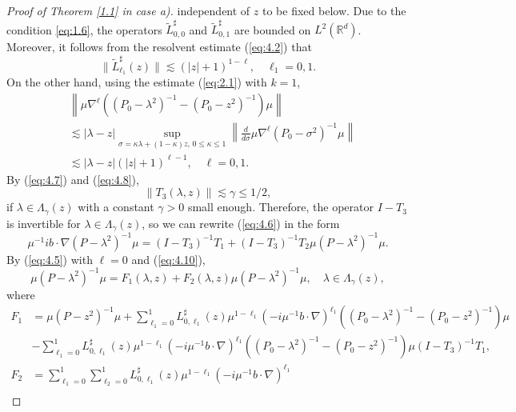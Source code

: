 \documentclass[11pt]{amsart}
\numberwithin{equation}{section}
\def\R{{\mathbb R}}
\begin{document}
\begin{proof}[Proof of Theorem \ref{1.1} in case a)]
independent of $z$ to be fixed below. Due to the condition \eqref{eq:1.6}, the operators 
$\widetilde L_{0,0}^\sharp$ and $\widetilde L_{0,1}^\sharp$ are bounded on $L^2(\R^d)$. Moreover, it follows from the resolvent estimate (\ref{eq:4.2}) that
\begin{equation}\label{eq:4.7}
\|\widetilde L_{\ell_1}^\sharp(z)\|\lesssim (|z|+1)^{1-\ell},\quad \ell_1=0,1.
\end{equation}
On the other hand, using the estimate (\ref{eq:2.1}) with $k=1$,
\begin{equation}\label{eq:4.8}
\begin{split}
&\left\|\mu \nabla^{\ell}((P_0-\lambda^2)^{-1}-(P_0-z^2)^{-1})\mu\right\|\\
&\lesssim|\lambda-z|\sup_{\sigma=\kappa\lambda+(1-\kappa)z,\,0\le\kappa\le 1}\left\|\frac{d}{d\sigma} \mu \nabla^{\ell}(P_0-\sigma^2)^{-1}\mu\right\|\\
&\lesssim |\lambda-z|(|z|+1)^{\ell-1},\quad \ell=0,1.
\end{split}
\end{equation}
By (\ref{eq:4.7}) and (\ref{eq:4.8}),
\begin{equation}\label{eq:4.9}
\|T_3(\lambda,z)\|\lesssim \gamma\le 1/2,
\end{equation}
if $\lambda\in\Lambda_\gamma(z)$ with a constant $\gamma>0$ small enough. Therefore, the operator $I-T_3$
is invertible for $\lambda\in\Lambda_\gamma(z)$, so we can rewrite (\ref{eq:4.6}) in the form
\begin{equation}\label{eq:4.10}
\mu^{-1}ib\cdot\nabla(P-\lambda^2)^{-1}\mu=(I-T_3)^{-1}T_1+(I-T_3)^{-1}T_2\mu(P-\lambda^2)^{-1}\mu.
\end{equation}
By (\ref{eq:4.5}) with $\ell = 0$ and (\ref{eq:4.10}),
\begin{equation}\label{eq:4.11}
\mu(P-\lambda^2)^{-1}\mu=F_1(\lambda,z)+F_2(\lambda,z)\mu(P-\lambda^2)^{-1}\mu,\quad \lambda\in\Lambda_\gamma(z),
\end{equation}
where
\begin{align*}
 F_1&=\mu(P-z^2)^{-1}\mu + \sum_{\ell_1 = 0}^1 L^\sharp_{0, \ell_1}(z)\mu^{1-\ell_1}(-i\mu^{-1}b\cdot\nabla)^{\ell_1} ((P_0-\lambda^2)^{-1}-(P_0-z^2)^{-1})\mu \\
 &-\sum_{\ell_1=0}^1L^\sharp_{0, \ell_1}(z)\mu^{1-\ell_1}(-i\mu^{-1}b\cdot\nabla)^{\ell_1}
((P_0-\lambda^2)^{-1}-(P_0-z^2)^{-1})\mu(I-T_3)^{-1}T_1,\\
 F_2&=\sum_{\ell_1=0}^1\sum_{\ell_2=0}^1L^\sharp_{0, \ell_1}(z)\mu^{1-\ell_1}(-i\mu^{-1}b\cdot\nabla)^{\ell_1} \\

\end{align*}
\end{proof}
\end{document}
